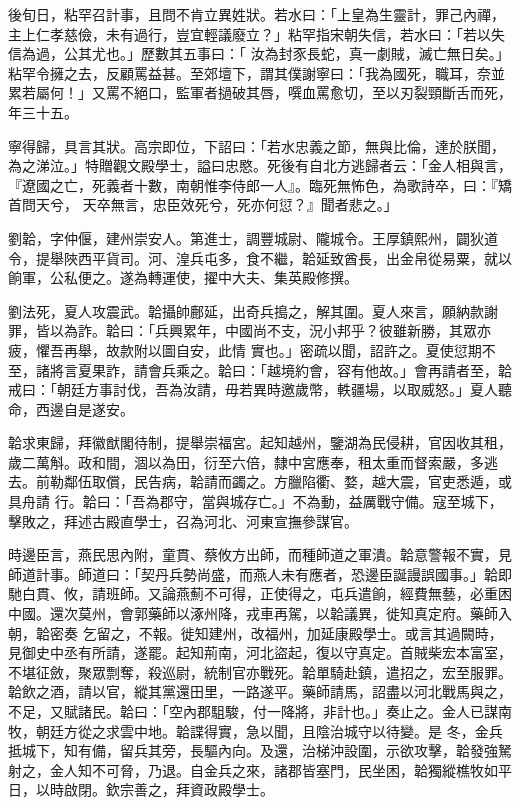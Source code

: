\begin{pinyinscope}
 後旬日，粘罕召計事，且問不肯立異姓狀。若水曰：「上皇為生靈計，罪己內禪，主上仁孝慈儉，未有過行，豈宜輕議廢立？」粘罕指宋朝失信，若水曰：「若以失信為過，公其尤也。」歷數其五事曰：「
 汝為封豕長蛇，真一劇賊，滅亡無日矣。」粘罕令擁之去，反顧罵益甚。至郊壇下，謂其僕謝寧曰：「我為國死，職耳，奈並累若屬何！」又罵不絕口，監軍者撾破其唇，噀血罵愈切，至以刃裂頸斷舌而死，年三十五。



 寧得歸，具言其狀。高宗即位，下詔曰：「若水忠義之節，無與比倫，達於朕聞，為之涕泣。」特贈觀文殿學士，謚曰忠愍。死後有自北方逃歸者云：「金人相與言，『遼國之亡，死義者十數，南朝惟李侍郎一人』。臨死無怖色，為歌詩卒，曰：『矯首問天兮，
 天卒無言，忠臣效死兮，死亦何愆？』聞者悲之。」



 劉韐，字仲偃，建州崇安人。第進士，調豐城尉、隴城令。王厚鎮熙州，闢狄道令，提舉陜西平貨司。河、湟兵屯多，食不繼，韐延致酋長，出金帛從易粟，就以餉軍，公私便之。遂為轉運使，擢中大夫、集英殿修撰。



 劉法死，夏人攻震武。韐攝帥鄜延，出奇兵搗之，解其圍。夏人來言，願納款謝罪，皆以為詐。韐曰：「兵興累年，中國尚不支，況小邦乎？彼雖新勝，其眾亦疲，懼吾再舉，故款附以圖自安，此情
 實也。」密疏以聞，詔許之。夏使愆期不至，諸將言夏果詐，請會兵乘之。韐曰：「越境約會，容有他故。」會再請者至，韐戒曰：「朝廷方事討伐，吾為汝請，毋若異時邀歲幣，軼疆場，以取威怒。」夏人聽命，西邊自是遂安。



 韐求東歸，拜徽猷閣待制，提舉崇福宮。起知越州，鑒湖為民侵耕，官因收其租，歲二萬斛。政和間，涸以為田，衍至六倍，隸中宮應奉，租太重而督索嚴，多逃去。前勒鄰伍取償，民告病，韐請而蠲之。方臘陷衢、婺，越大震，官吏悉遁，或具舟請
 行。韐曰：「吾為郡守，當與城存亡。」不為動，益厲戰守備。寇至城下，擊敗之，拜述古殿直學士，召為河北、河東宣撫參謀官。



 時邊臣言，燕民思內附，童貫、蔡攸方出師，而種師道之軍潰。韐意警報不實，見師道計事。師道曰：「契丹兵勢尚盛，而燕人未有應者，恐邊臣誕謾誤國事。」韐即馳白貫、攸，請班師。又論燕薊不可得，正使得之，屯兵遣餉，經費無藝，必重困中國。還次莫州，會郭藥師以涿州降，戎車再駕，以韐議異，徙知真定府。藥師入朝，韐密奏
 乞留之，不報。徙知建州，改福州，加延康殿學士。或言其過闕時，見御史中丞有所請，遂罷。起知荊南，河北盜起，復以守真定。首賊柴宏本富室，不堪征斂，聚眾剽奪，殺巡尉，統制官亦戰死。韐單騎赴鎮，遣招之，宏至服罪。韐飲之酒，請以官，縱其黨還田里，一路遂平。藥師請馬，詔盡以河北戰馬與之，不足，又賦諸民。韐曰：「空內郡駔駿，付一降將，非計也。」奏止之。金人已謀南牧，朝廷方從之求雲中地。韐諜得實，急以聞，且陰治城守以待變。是
 冬，金兵抵城下，知有備，留兵其旁，長驅內向。及還，治梯沖設圍，示欲攻擊，韐發強駑射之，金人知不可脅，乃退。自金兵之來，諸郡皆塞門，民坐困，韐獨縱樵牧如平日，以時啟閉。欽宗善之，拜資政殿學士。




\end{pinyinscope}

